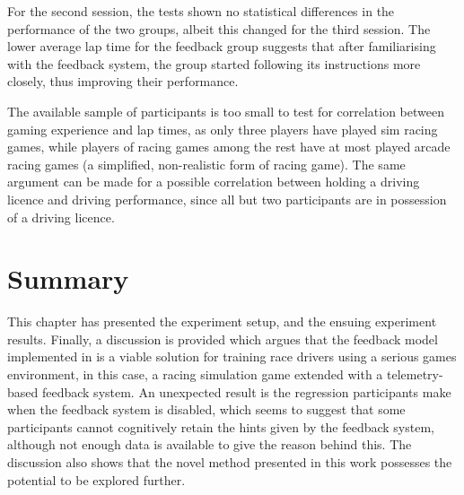 For the second session, the tests shown no statistical differences in the performance of the two groups, albeit this changed for the third session. The lower average lap time for the feedback group suggests that after familiarising with the feedback system, the group started following its instructions more closely, thus improving their performance.

The available sample of participants is too small to test for correlation between gaming experience and lap times, as only three players have played sim racing games, while players of racing games among the rest have at most played arcade racing games (a simplified, non-realistic form of racing game). The same argument can be made for a possible correlation between holding a driving licence and driving performance, since all but two participants are in possession of a driving licence.
%

\section{Summary}
This chapter has presented the experiment setup, and the ensuing experiment results. Finally, a discussion is provided which argues that the feedback model implemented in \methodname is a viable solution for training race drivers using a serious games environment, in this case, a racing simulation game extended with a telemetry-based feedback system. An unexpected result is the regression participants make when the feedback system is disabled, which seems to suggest that some participants cannot cognitively retain the hints given by the feedback system, although not enough data is available to give the reason behind this. The discussion also shows that the novel method presented in this work possesses the potential to be explored further. 

%
